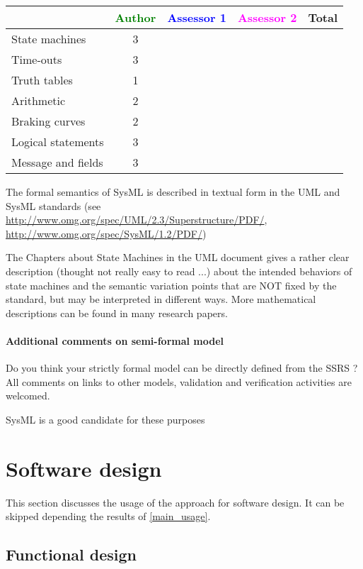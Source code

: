 \begin{tabular}{|l | c | c | c | c|}
\hline
& \textcolor{green}{Author} & \textcolor{blue}{Assessor 1} & \textcolor{magenta}{Assessor 2} & Total \\
\hline 
State machines  &3 & & &  \\
\hline
Time-outs  &3 & & &  \\
\hline
Truth tables  &1 & & &  \\
\hline
Arithmetic  & 2& & &  \\
\hline
Braking curves  &2 & & &  \\
\hline
Logical statements &3 & & &  \\
\hline
Message and fields &3 & & &  \\
\hline
\end{tabular}
\begin{author_comment}

The formal semantics of SysML is described in textual form in the UML and SysML standards
(see \url{http://www.omg.org/spec/UML/2.3/Superstructure/PDF/}, \url{http://www.omg.org/spec/SysML/1.2/PDF/})

The Chapters about State Machines in the UML
document gives a rather clear description (thought not really easy
to read ...) about the intended behaviors of state machines and the
semantic variation points that are NOT fixed by the standard, but may
be interpreted in different ways. More mathematical descriptions can
be found in  many research papers.
\end{author_comment}
\paragraph{Additional comments on semi-formal  model} Do you think your strictly formal  model can be directly defined from the SSRS ?
All comments on links to  other models, validation and verification activities are welcomed.

\begin{author_comment}
SysML is a good candidate for these purposes
\end{author_comment}
\section{Software design}
This section discusses the usage of the approach for software design.
It can be skipped depending the results of \ref{main_usage}.

\subsection{Functional design}


